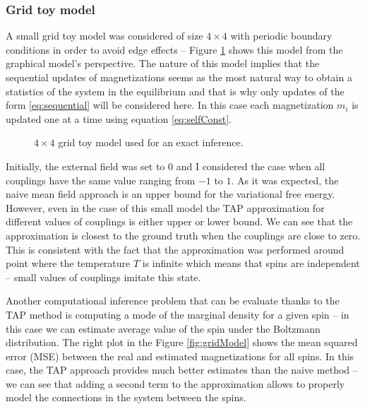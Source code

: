 \documentclass[../report/report.tex]{subfiles}
\begin{document}
\subsubsection{Grid toy model}
A small grid toy model was considered of size $4 \times 4$ with periodic boundary conditions in order to avoid edge effects -- Figure \ref{fig:grid} shows this model from the graphical model's perspective. The nature of this model implies that the sequential updates of magnetizations seems as the most natural way to obtain a statistics of the system in the equilibrium and that is why only updates of the form \ref{eq:sequential} will be considered here. In this case each magnetization $m_i$ is updated one at a time using equation \ref{eq:selfConst}.

\begin{figure}[!htb]
\begin{center}

\end{center}
  \caption[1]{$4 \times 4$ grid toy model used for an exact inference.}
    \label{fig:grid}
\end{figure}

Initially, the external field was set to $0$ and I considered the case when all couplings have the same value ranging from $-1$ to $1$. As it was expected, the naive mean field approach is an upper bound for the variational free energy. However, even in the case of this small model the TAP approximation for different values of couplings is either upper or lower bound. We can see that the approximation is closest to the ground truth when the couplings are close to zero. This is consistent with the fact that the approximation was performed around point where the temperature $T$ is infinite which means that spins are independent -- small values of couplings imitate this state.

Another computational inference problem that can be evaluate thanks to the TAP method is computing a mode of the marginal density for a given spin -- in this case we can estimate average value of the spin under the Boltzmann distribution. The right plot in the Figure \ref{fig:gridModel} shows the mean squared error (MSE) between the real and estimated magnetizations for all spins. In this case, the TAP approach provides much better estimates than the naive method -- we can see that adding a second term to the approximation allows to properly model the connections in the system between the spins. 
\end{document}
